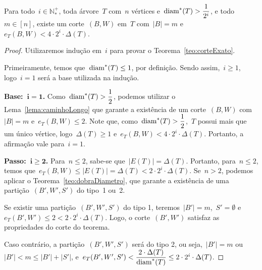 	\begin{teo}
	\label{teo:corteExato}
		Para todo~${i\in \mathbb{N^+_*}}$, toda árvore~$T$ com~$n$
		vértices e~${\mathrm{diam}^*(T)>\dfrac{1}{2^i}}$, e todo~${m\in[n]}$,
		existe um corte~$(B,W)$ em~$T$ com~$|B|=m$ 
		e~$e_T(B,W)< 4\cdot 2^i\cdot \Delta(T)$.
	\end{teo}

	\medskip
	\medskip

	\begin{proof}
		Utilizaremos indução em~$i$ para provar o Teorema~\ref{teo:corteExato}.
		
		Primeiramente, temos que~${\mathrm{diam}^*(T)\le1}$, por definição. 
		Sendo assim,~${i\ge1}$, logo~${i=1}$ será a base 
		utilizada na indução.
		
		\textbf{Base:~${\mathbf {i=1}}$.}
		Como~${\mathrm{diam}^*(T)>\dfrac{1}{2}}$,
		podemos utilizar o Lema~\ref{lema:caminhoLongo} que
		garante a existência de 
		um corte~$(B,W)$ 
		com~${|B|=m}$ e~${e_T(B,W)\le 2}$.
		Note que, como~${\mathrm{diam}^*(T)>\dfrac{1}{2}}$,~$T$
		possui mais que um único vértice, logo~${\Delta(T)\ge 1}$
		e~${e_T(B,W)< 4\cdot 2^i\cdot \Delta(T)}$.
		Portanto, a afirmação vale para~${i=1}$.


		\textbf{Passo:~${\mathbf{i\ge 2}}$.} 
		Para~${n\le 2}$, sabe-se que~${|E(T)|=\Delta(T)}$. 
		Portanto, para~${n\le 2}$, temos 
		que~${e_T(B,W)\le |E(T)|=\Delta(T)< 2\cdot 2^i\cdot 
		\Delta(T)}$.
		Se~${n>2}$, podemos aplicar o
		Teorema~\ref{teo:dobraDiametro}, que garante a existência 
		de uma partição~$(B',W',S')$ do tipo~1 ou~2.

			Se existir uma partição~$(B',W',S')$ do tipo 1, 
			teremos~${|B'|=m}$,~${S'=\emptyset}$
			e~${e_T(B',W')\le2< 2\cdot 2^i\cdot \Delta(T)}$.
			Logo, o corte~$(B',W')$ satisfaz as propriedades
			do corte do teorema.

			Caso contrário, a partição~$(B',W',S')$ será do tipo 2, ou 
			seja,~${|B'|=m}$ ou~${|B'|<m\le |B'|+|S'|}$, 
			e~${e_T(B',W',S')< \dfrac{2\cdot\Delta(T)}{\mathrm{diam}^*(T)}\le
			2\cdot2^i\cdot\Delta(T)}$.
			

\end{proof}
